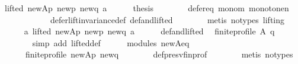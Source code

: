 \begin{isabellebody}
\ {\isachardoublequoteopen}lifted\ {\isacharquery}{\kern0pt}new{\isacharunderscore}{\kern0pt}Ap\ {\isacharquery}{\kern0pt}new{\isacharunderscore}{\kern0pt}p\ {\isacharquery}{\kern0pt}new{\isacharunderscore}{\kern0pt}q\ a{\isachardoublequoteclose}\isanewline
\ \ \ \ \isamarkupfalse%
\ {\isacharquery}{\kern0pt}thesis\isanewline
\ \ \ \ \ \ \isamarkupfalse%
\ defer{\isacharunderscore}{\kern0pt}eq\ mono{\isacharunderscore}{\kern0pt}m\ monotone{\isacharunderscore}{\kern0pt}n\isanewline
\ \ \ \ \ \ \ \ \ \ \ \ defer{\isacharunderscore}{\kern0pt}lift{\isacharunderscore}{\kern0pt}invariance{\isacharunderscore}{\kern0pt}def\ def{\isacharunderscore}{\kern0pt}and{\isacharunderscore}{\kern0pt}lifted\isanewline
\ \ \ \ \ \ \isamarkupfalse%
\ {\isacharparenleft}{\kern0pt}metis\ {\isacharparenleft}{\kern0pt}no{\isacharunderscore}{\kern0pt}types{\isacharcomma}{\kern0pt}\ lifting{\isacharparenright}{\kern0pt}{\isacharparenright}{\kern0pt}\isanewline
\ \ \isamarkupfalse%
\isanewline
\ \ \ \ \isamarkupfalse%
\ a{}{\isacharcolon}{\kern0pt}\ {\isachardoublequoteopen}{\isasymnot}lifted\ {\isacharquery}{\kern0pt}new{\isacharunderscore}{\kern0pt}Ap\ {\isacharquery}{\kern0pt}new{\isacharunderscore}{\kern0pt}p\ {\isacharquery}{\kern0pt}new{\isacharunderscore}{\kern0pt}q\ a{\isachardoublequoteclose}\isanewline
\ \ \ \ \isamarkupfalse%
\ def{\isacharunderscore}{\kern0pt}and{\isacharunderscore}{\kern0pt}lifted\ \isamarkupfalse%
\ {\isachardoublequoteopen}finite{\isacharunderscore}{\kern0pt}profile\ A\ q{\isachardoublequoteclose}\isanewline
\ \ \ \ \ \ \isamarkupfalse%
\ {\isacharparenleft}{\kern0pt}simp\ add{\isacharcolon}{\kern0pt}\ lifted{\isacharunderscore}{\kern0pt}def{\isacharparenright}{\kern0pt}\isanewline
\ \ \ \ \isamarkupfalse%
\ modules\ new{\isacharunderscore}{\kern0pt}A{\isacharunderscore}{\kern0pt}eq\ \isamarkupfalse%
\ {}{\isacharcolon}{\kern0pt}\isanewline
\ \ \ \ \ \ {\isachardoublequoteopen}finite{\isacharunderscore}{\kern0pt}profile\ {\isacharquery}{\kern0pt}new{\isacharunderscore}{\kern0pt}Ap\ {\isacharquery}{\kern0pt}new{\isacharunderscore}{\kern0pt}q{\isachardoublequoteclose}\isanewline
\ \ \ \ \ \ \isamarkupfalse%
\ def{\isacharunderscore}{\kern0pt}presv{\isacharunderscore}{\kern0pt}fin{\isacharunderscore}{\kern0pt}prof\isanewline
\ \ \ \ \ \ \isamarkupfalse%
\ {\isacharparenleft}{\kern0pt}metis\ {\isacharparenleft}{\kern0pt}no{\isacharunderscore}{\kern0pt}types{\isacharparenright}{\kern0pt}{\isacharparenright}{\kern0pt}\isanewline

\end{isabellebody}
